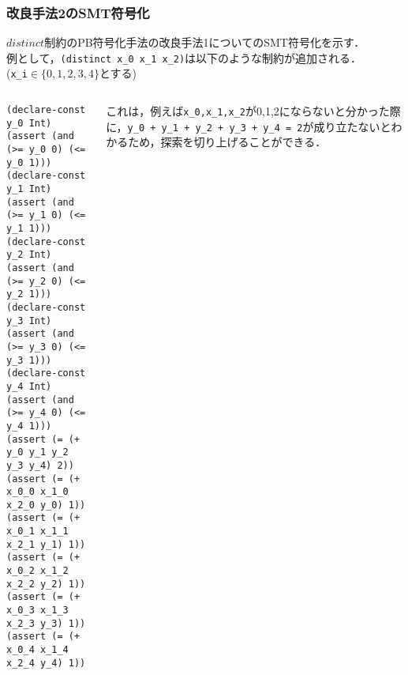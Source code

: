 \documentclass [dvipdfmx,12pt]{beamer}
\newcommand{\backupend}{
    \addtocounter{framenumberappendix}{-\value{framenumber}}
    \addtocounter{framenumber}{\value{framenumberappendix}}
}
\newcommand{\distinct}{$distinct$}
\begin{document}
\begin{frame}[fragile]\footnotesize
    \frametitle{改良手法2のSMT符号化}
    \distinct 制約のPB符号化手法の改良手法1についてのSMT符号化を示す．\\
    例として，\verb|(distinct x_0 x_1 x_2)|は以下のような制約が追加される．\\
    (\verb|x_i|$\in \{0,1,2,3,4\}$とする)

    \begin{columns}
        \begin{column}{0.5\textwidth}
            \begin{exampleblock}{}\scriptsize
\begin{verbatim}
(declare-const y_0 Int)
(assert (and (>= y_0 0) (<= y_0 1)))
(declare-const y_1 Int)
(assert (and (>= y_1 0) (<= y_1 1)))
(declare-const y_2 Int)
(assert (and (>= y_2 0) (<= y_2 1)))
(declare-const y_3 Int)
(assert (and (>= y_3 0) (<= y_3 1)))
(declare-const y_4 Int)
(assert (and (>= y_4 0) (<= y_4 1)))
(assert (= (+ y_0 y_1 y_2 y_3 y_4) 2))
(assert (= (+ x_0_0 x_1_0 x_2_0 y_0) 1))
(assert (= (+ x_0_1 x_1_1 x_2_1 y_1) 1))
(assert (= (+ x_0_2 x_1_2 x_2_2 y_2) 1))
(assert (= (+ x_0_3 x_1_3 x_2_3 y_3) 1))
(assert (= (+ x_0_4 x_1_4 x_2_4 y_4) 1))
\end{verbatim}
            \end{exampleblock}
        \end{column}
        \begin{column}{0.5\textwidth}\scriptsize
            これは，例えば\verb|x_0,x_1,x_2|が0,1,2にならないと分かった際に，\verb|y_0 + y_1 + y_2 + y_3 + y_4 = 2|が成り立たないとわかるため，探索を切り上げることができる．
        \end{column}
    \end{columns}

\end{frame}


\backupend
\end{document}
